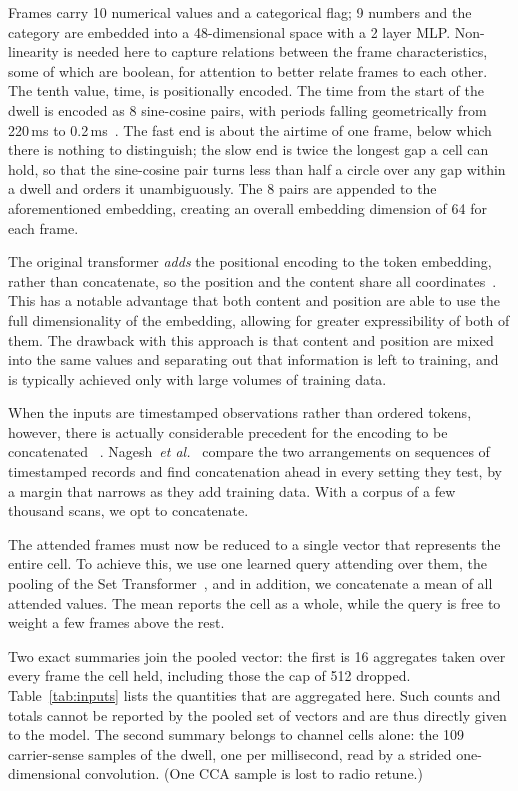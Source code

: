 \documentclass[conference]{IEEEtran}
\begin{document}
Frames carry 10 numerical values and a 
categorical flag; 9 numbers and the category are embedded into a 48-dimensional space 
with a 2 layer MLP. 
Non-linearity is needed here to capture relations between the frame characteristics, 
some of which are boolean, for attention to better relate frames to each other. 
The tenth value, time, is positionally encoded. The time from the start of the dwell 
is encoded as 8 sine-cosine pairs, with periods falling geometrically from 220\,ms to 
0.2\,ms~\cite{vaswani2017}. 
The fast end is about the airtime of one frame, below which there is nothing to 
distinguish; the slow end is twice the longest gap a cell can hold, so that the
sine-cosine pair turns less than half a circle over any gap within a dwell and 
orders it unambiguously. The 8 pairs are appended to the aforementioned embedding, 
creating an overall embedding dimension of 64 for each frame.

The original transformer \textit{adds} the positional encoding to the token embedding, rather than 
concatenate, so the position and the content share all coordinates~\cite{vaswani2017}. 
This has a notable advantage that both content and position are able to use the full
dimensionality of the embedding, allowing for greater expressibility of both of them. 
The drawback with this approach is that content and position are mixed into the same values
and separating out that information is left to training, and is typically achieved only with
large volumes of training data.

When the inputs are timestamped observations rather than ordered tokens, however, 
there is actually considerable precedent for the encoding to be concatenated%
~\cite{xu2019functional,horn2020seft}. Nagesh~\emph{et al.}~\cite{nagesh2021ema} 
compare the two arrangements on sequences of timestamped records and find concatenation 
ahead in every setting they test, by a margin that narrows as they add training data. With a
corpus of a few thousand scans, we opt to concatenate.

The attended frames must now be reduced to a single vector that represents the entire cell. 
To achieve this, we use one learned query attending over them, the pooling of the Set
Transformer~\cite{lee2019set}, and in addition, we concatenate a mean of all attended values.
The mean reports the cell as a whole, while the query is free to weight a few frames above 
the rest. 

Two exact summaries join the pooled vector: the first is 16 aggregates taken
over every frame the cell held, including those the cap of 512 dropped.
Table~\ref{tab:inputs} lists the quantities that are aggregated here.
Such counts and totals cannot be reported by the pooled set of vectors 
and are thus directly given to the model. The second summary belongs to channel 
cells alone: the 109 carrier-sense samples of the dwell, one per millisecond, 
read by a strided one-dimensional convolution. (One CCA sample is lost to 
radio retune.)
\end{document}
